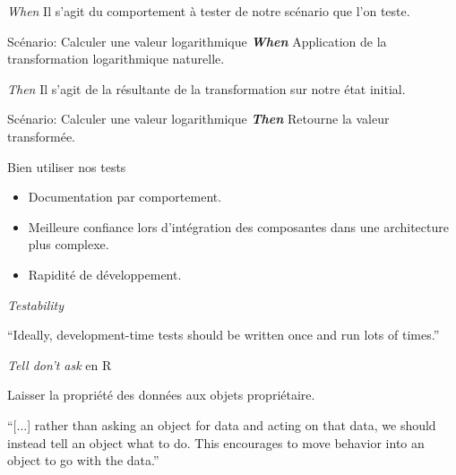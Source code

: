 \documentclass[11pt]{beamer}
\begin{document}
\begin{frame}{\textit{When}}
Il s'agit du comportement à tester de notre scénario que l'on teste.

\begin{block}{Scénario: Calculer une valeur logarithmique}
\textit{\textbf{When}} Application de la transformation logarithmique naturelle. 
\end{block}
\end{frame}

\begin{frame}{\textit{Then}}
Il s'agit de la résultante de la transformation sur notre état initial.
\begin{block}{Scénario: Calculer une valeur logarithmique}
\textit{\textbf{Then}} Retourne la valeur transformée.
\end{block}
\end{frame}

\begin{frame}{Bien utiliser nos tests}
\begin{itemize}
\item Documentation par comportement.
\item Meilleure confiance lors d'intégration des composantes dans une architecture plus complexe.
\item Rapidité de développement.
\end{itemize}
\end{frame}

\begin{frame}{\textit{Testability}}
\begin{block}{}
{\large ``Ideally, development-time tests should be written once and run lots of times.''}
\vskip5mm
\hspace*{}
\end{block}
\end{frame}

\begin{frame}{\textit{Tell don't ask} en R}

Laisser la propriété des données aux objets propriétaire.

\begin{block}{}
{\large ``[...] rather than asking an object for data and acting on that data, we should instead tell an object what to do. This encourages to move behavior into an object to go with the data.''}
\vskip5mm
\hspace*{}
\end{block}
\end{frame}
\end{document}
